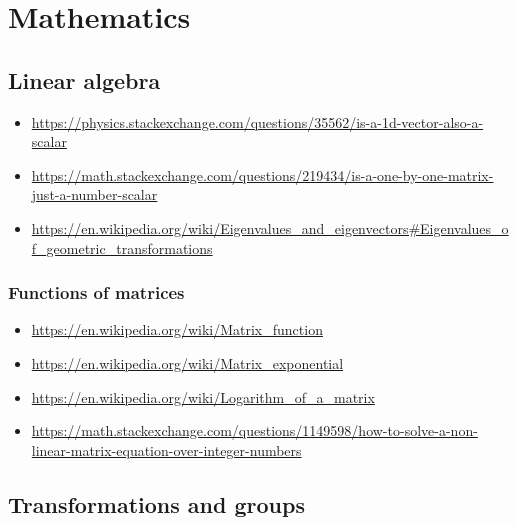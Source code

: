 \chapter{Mathematics}

\section{Linear algebra}

\begin{itemize}
\item \url{https://physics.stackexchange.com/questions/35562/is-a-1d-vector-also-a-scalar}
\item \url{https://math.stackexchange.com/questions/219434/is-a-one-by-one-matrix-just-a-number-scalar}
\item \url{https://en.wikipedia.org/wiki/Eigenvalues_and_eigenvectors#Eigenvalues_of_geometric_transformations}
\end{itemize}
\subsection{Functions of matrices}
\begin{itemize}
\item \url{https://en.wikipedia.org/wiki/Matrix_function}
\item \url{https://en.wikipedia.org/wiki/Matrix_exponential}
\item \url{https://en.wikipedia.org/wiki/Logarithm_of_a_matrix}
\item \url{https://math.stackexchange.com/questions/1149598/how-to-solve-a-non-linear-matrix-equation-over-integer-numbers}
\end{itemize}
\section{Transformations and groups}

